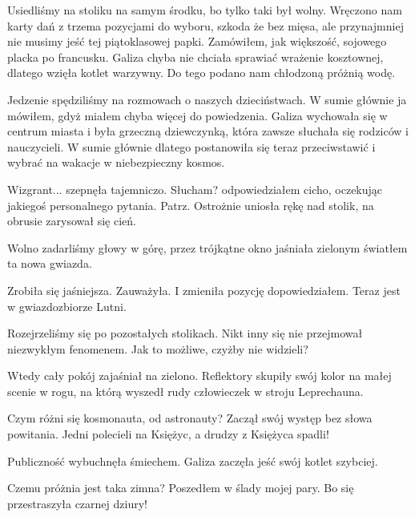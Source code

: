 Usiedliśmy na stoliku na samym środku, bo tylko taki był wolny.
Wręczono nam karty dań z trzema pozycjami do wyboru, szkoda że bez mięsa, ale przynajmniej nie musimy jeść tej piątoklasowej papki.
Zamówiłem, jak większość, sojowego placka po francusku.
Galiza chyba nie chciała sprawiać wrażenie kosztownej, dlatego wzięła kotlet warzywny.
Do tego podano nam chłodzoną próżnią wodę.

Jedzenie spędziliśmy na rozmowach o naszych dzieciństwach.
W sumie głównie ja mówiłem, gdyż miałem chyba więcej do powiedzenia.
Galiza wychowała się w centrum miasta i była grzeczną dziewczynką, która zawsze słuchała się rodziców i nauczycieli.
W sumie głównie dlatego postanowiła się teraz przeciwstawić i wybrać na wakacje w niebezpieczny kosmos.

\begin{dialogue}
	\ds{} Wizgrant... \dm{} szepnęła tajemniczo.
	\ds{} Słucham? \dm{} odpowiedziałem cicho, oczekując jakiegoś personalnego pytania.
	\ds{} Patrz. \dm{} Ostrożnie uniosła rękę nad stolik, na obrusie zarysował się cień.
\end{dialogue}

Wolno zadarliśmy głowy w górę, przez trójkątne okno jaśniała zielonym światłem ta nowa gwiazda.

\begin{dialogue}
	\ds{} Zrobiła się jaśniejsza. \dm{} Zauważyła.
	\ds{} I zmieniła pozycję \dm{} dopowiedziałem. \dm{} Teraz jest w gwiazdozbiorze Lutni.
\end{dialogue}

Rozejrzeliśmy się po pozostałych stolikach. Nikt inny się nie przejmował niezwykłym fenomenem.
Jak to możliwe, czyżby nie widzieli?

Wtedy cały pokój zajaśniał na zielono.
Reflektory skupiły swój kolor na małej scenie w rogu, na którą wyszedł rudy człowieczek w stroju Leprechauna.

\begin{dialogue}
	\ds{} Czym różni się kosmonauta, od astronauty? \dm{} Zaczął swój występ bez słowa powitania. \dm{} Jedni polecieli na Księżyc, a drudzy z Księżyca spadli!
\end{dialogue}

Publiczność wybuchnęła śmiechem. Galiza zaczęła jeść swój kotlet szybciej.

\begin{dialogue}
	\ds{} Czemu próżnia jest taka zimna? \dm{} Poszedłem w ślady mojej pary. \dm{} Bo się przestraszyła czarnej dziury!
\end{dialogue}

